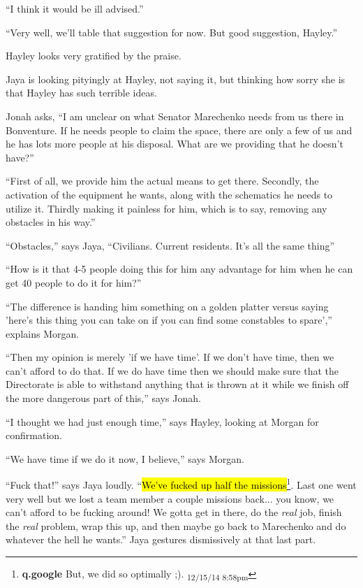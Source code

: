 ``I think it would be ill advised.''

``Very well, we'll table that suggestion for now.  But good suggestion, Hayley.'' 

Hayley looks very gratified by the praise.

Jaya is looking pityingly at Hayley, not saying it, but thinking how sorry she is that Hayley has such terrible ideas.

Jonah asks, ``I am unclear on what Senator Marechenko needs from us there in Bonventure.  If he needs people to claim the space, there are only a few of us and he has lots more people at his disposal.  What are we providing that he doesn't have?''

``First of all, we provide him the actual means to get there. Secondly, the activation of the equipment he wants, along with the schematics he needs to utilize it.  Thirdly making it painless for him, which is to say, removing any obstacles in his way.''

``Obstacles,'' says Jaya, ``Civilians.  Current residents.  It's all the same thing''  

``How is it that 4-5 people doing this for him any advantage for him when he can get 40 people to do it for him?''

``The difference is handing him something on a golden platter versus saying 'here's this thing you can take on if you can find some constables to spare','' explains Morgan.

``Then my opinion is merely 'if we have time'.  If we don't have time, then we can't afford to do that.  If we do have time then we should make sure that the Directorate is able to withstand anything that is thrown at it while we finish off the more dangerous part of this,'' says Jonah.

``I thought we had just enough time,'' says Hayley, looking at Morgan for confirmation.

``We have time if we do it now, I believe,'' says Morgan.

``Fuck that!'' says Jaya loudly.  ``\hl{We've fucked up half the missions}\footnote{\textbf{q.google }But, we did so optimally ;). \textsubscript{12/15/14 8:58pm}}.  Last one went very well but we lost a team member a couple missions back... you know, we can't afford to be fucking around!  We gotta get in there, do the \textit{real} job, finish the \textit{real} problem, wrap this up, and then maybe go back to Marechenko and do whatever the hell he wants.'' Jaya gestures dismissively at that last part.

